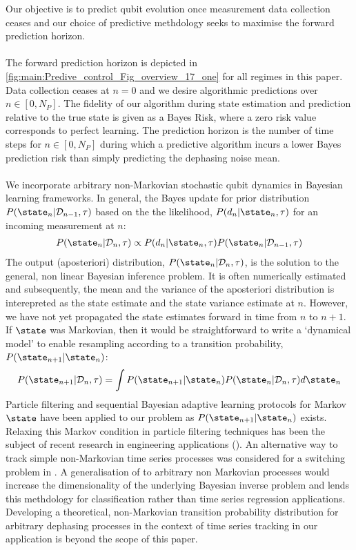 Our objective is to predict qubit evolution once measurement data collection ceases and our choice of predictive methdology seeks to maximise the forward prediction horizon. 
\\
\\
The forward prediction horizon is depicted in \cref{fig:main:Predive_control_Fig_overview_17_one} for all regimes in this paper. Data collection ceases at $n=0$  and we desire algorithmic predictions over $ n \in [0, N_P]$. The fidelity of our algorithm during state estimation and prediction relative to the true state is given as a Bayes Risk, where a zero risk value corresponds to perfect learning. The prediction horizon is the number of time steps for $ n \in [0, N_P]$ during which a predictive algorithm incurs a lower Bayes prediction risk than simply predicting the dephasing noise mean.
\\
\\
We incorporate arbitrary non-Markovian stochastic qubit dynamics in Bayesian learning frameworks. In general, the Bayes update for prior distribution $P(\state_n | \mathcal{D}_{n-1}, \tau)$ based on the the likelihood, $P(d_n | \state_n, \tau)$ for an incoming measurement at $n$: 
\begin{align}
P(\state_n| \mathcal{D}_n, \tau)  \propto P(d_n | \state_n, \tau) P(\state_n | \mathcal{D}_{n-1}, \tau)
\end{align}
The output (aposteriori) distribution, $P(\state_n| \mathcal{D}_n, \tau)$, is the solution to the general, non linear Bayesian inference problem. It is often numerically estimated and subsequently, the mean and the variance of the aposteriori distribution is interepreted as the state estimate and the state variance estimate at $n$. However, we have not yet propagated the state estimates forward in time from $n$ to $n+1$. If $\state$ was Markovian, then it would be straightforward to write a `dynamical model' to enable resampling according to a transition probability, $P(\state_{n+1} | \state_n)$:
\begin{align}
P(\state_{n+1} | \mathcal{D}_{n}, \tau) = \int P(\state_{n+1} | \state_n) P(\state_n | \mathcal{D}_{n}, \tau) d\state_n
\end{align}
Particle filtering and sequential Bayesian adaptive learning protocols for Markov $\state$ have been applied to our problem as $ P(\state_{n+1} | \state_n)$ exists. Relaxing this Markov condition in particle filtering techniques has been the subject of recent research in engineering applications (\cite{wiebe2015bayesian, jacob2016}). An alternative way to track simple non-Markovian time series processes was considered for a switching problem in \cite{rogers2017}. A generalisation of \cite{rogers2017} to arbitrary non Markovian processes would increase the dimensionality of the underlying Bayesian inverse problem and lends this methdology for classification rather than time series regression applications. Developing a theoretical, non-Markovian transition probability distribution for arbitrary dephasing processes in the context of time series tracking in our application is beyond the scope of this paper.  
